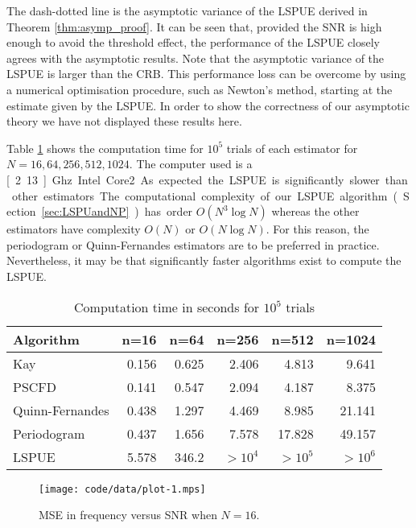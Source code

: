 \documentclass[journal]{IEEEtran}
\begin{document}
The dash-dotted line is the asymptotic variance of the LSPUE derived in
Theorem \ref{thm:asymp_proof}.  It can be seen that, provided the SNR is high
enough to avoid the threshold effect, the performance of the LSPUE closely
agrees with the asymptotic results.  Note that the asymptotic variance of the LSPUE is larger than the CRB.  This performance loss can be overcome by using a numerical optimisation procedure, such as Newton's method, starting at the estimate given by the LSPUE.  In order to show the correctness of our asymptotic theory we have not displayed these results here.

Table \ref{tab_computation_time} shows the computation time for $10^5$ trials of each estimator for $N=16,64,256,512,1024$. The computer used is a \unit[2.13]{Ghz} Intel Core2. As expected the LSPUE is significantly slower than other estimators. The computational complexity of our LSPUE algorithm (Section \ref{sec:LSPUandNP}) has order $O(N^3\log{N})$ whereas the other estimators have complexity $O(N)$ or $O(N\log{N})$.  For this reason, the periodogram or Quinn-Fernandes estimators are to be preferred in practice. Nevertheless, it may be that significantly faster algorithms exist to compute the LSPUE.

\begin{table}[h]
\centering
\caption{Computation time in seconds for $10^5$ trials}
\begin{tabular}{lrrrrr}
Algorithm & \multicolumn{1}{l}{n=16} & \multicolumn{1}{l}{n=64} & \multicolumn{1}{l}{n=256} & \multicolumn{1}{l}{n=512} & \multicolumn{1}{l}{n=1024} \\ \toprule
Kay  & 0.156 & 0.625 & 2.406 & 4.813 & 9.641\\ 
PSCFD  & 0.141 & 0.547 & 2.094 & 4.187 & 8.375\\ 
Quinn-Fernandes  & 0.438 & 1.297 & 4.469 & 8.985 & 21.141\\ 
Periodogram & 0.437 & 1.656 & 7.578 & 17.828 & 49.157\\
LSPUE & 5.578 & 346.2 & $>10^4$ & $>10^5$ & $>10^6$ \\ \bottomrule
\end{tabular}
\label{tab_computation_time}
\end{table}

\begin{figure}[htbp]
	\centering
		\texttt{[image: code/data/plot-1.mps]}
		\caption{MSE in frequency versus SNR when $N=16$.}
		\label{plot:MSEvSNRn=16}
\end{figure}
\end{document}
